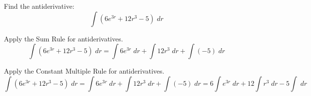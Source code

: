 \documentclass{ximera}
\author{Emma Smith Zbarsky\and Nela Lakos}
\begin{document}
\begin{exercise}

Find the antiderivative: \[\int \left(6e^{3r} +12r^3 -5\right)\; dr\]

\begin{hint}
Apply the Sum Rule for antiderivatives.
\[\int \left(6e^{3r} +12r^3 -5\right)\; dr=\int 6e^{3r}\; dr +\int12r^3\; dr+ \int(-5)\; dr\]
\end{hint}


\begin{hint}
Apply the Constant Multiple Rule for antiderivatives.
\[\int \left(6e^{3r} +12r^3 -5\right)\; dr=\int 6e^{3r}\; dr +\int12r^3\; dr+ \int(-5)\; dr=6\int e^{3r}\; dr +12\int r^3\; dr-5 \int\; dr\]
\end{hint}

\begin{multipleChoice}
\end{multipleChoice}

\end{exercise}
\end{document}
